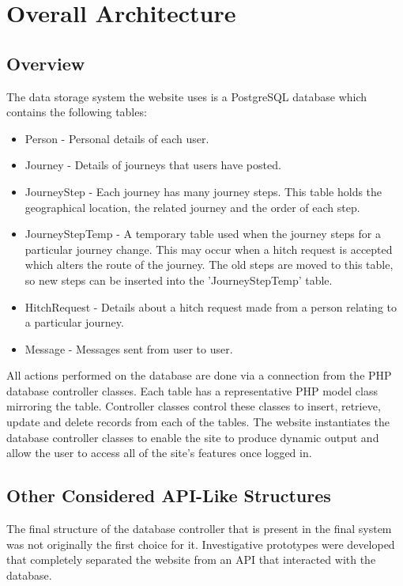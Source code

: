 \section{Overall Architecture}
	\subsection{Overview}	
		The data storage system the website uses is a PostgreSQL database which contains the following tables:
		\begin{itemize}
		\item Person - Personal details of each user.
		\item Journey - Details of journeys that users have posted.
		\item Journey\textunderscore Step - Each journey has many journey steps. This table holds the geographical location, the related journey and the order of each step.
		\item Journey\textunderscore Step\textunderscore Temp - A temporary table used when the journey steps for a particular journey change. This may occur when a hitch request is accepted which alters the route of the journey. The old steps are moved to this table, so new steps can be inserted into the 'Journey\textunderscore Step\textunderscore Temp' table.
		\item Hitch\textunderscore Request - Details about a hitch request made from a person relating to a particular journey.
		\item Message - Messages sent from user to user.
		\end{itemize}
		
		All actions performed on the database are done via a connection from the PHP database controller classes. Each table has a representative PHP model class mirroring the table. Controller classes control these classes to insert, retrieve, update and delete records from each of the tables. The website instantiates the database controller classes to enable the site to produce dynamic output and allow the user to access all of the site's features once logged in.
		
	\subsection{Other Considered API-Like Structures}
		The final structure of the database controller that is present in the final system was not originally the first choice for it. Investigative prototypes were developed that completely separated the website from an API that interacted with the database. 
		
